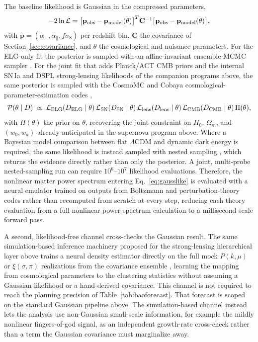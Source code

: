 \documentclass[10pt,onecolumn]{article}
\newcommand{\fsig}{f\sigma_8}
\begin{document}
The baseline likelihood is Gaussian in the compressed parameters,
\begin{equation}
  -2\ln\mathcal{L} =
  \big[\mathbf{p}_{\rm obs}-\mathbf{p}_{\rm model}(\theta)\big]^{T}
  \mathbf{C}^{-1}
  \big[\mathbf{p}_{\rm obs}-\mathbf{p}_{\rm model}(\theta)\big],
  \label{eq:gausslike}
\end{equation}
with $\mathbf{p}=(\alpha_\perp,\alpha_\parallel,\fsig)$ per redshift bin, $\mathbf{C}$ the covariance of Section~\ref{sec:covariance}, and $\theta$ the cosmological and nuisance parameters. For the ELG-only fit the posterior is sampled with an affine-invariant ensemble MCMC sampler \cite{emcee2013}. For the joint fit that adds Planck/ACT CMB priors and the internal SN\,Ia and DSPL strong-lensing likelihoods of the companion programs above, the same posterior is sampled with the CosmoMC and Cobaya cosmological-parameter-estimation codes \cite{lewisbridle2002,torradolewis2021},
\begin{equation}
  \mathcal{P}(\theta\mid D) \;\propto\;
  \mathcal{L}_{\rm ELG}(D_{\rm ELG}\mid\theta)\,
  \mathcal{L}_{\rm SN}(D_{\rm SN}\mid\theta)\,
  \mathcal{L}_{\rm lens}(D_{\rm lens}\mid\theta)\,
  \mathcal{L}_{\rm CMB}(D_{\rm CMB}\mid\theta)\,
  \Pi(\theta),
  \label{eq:jointpost}
\end{equation}
with $\Pi(\theta)$ the prior on $\theta$, recovering the joint constraint on $H_0$, $\Omega_m$, and $(w_0,w_a)$ already anticipated in the supernova program above. Where a Bayesian model comparison between flat $\Lambda$CDM and dynamic dark energy is required, the same likelihood is instead sampled with nested sampling \cite{polychord2015}, which returns the evidence directly rather than only the posterior. A joint, multi-probe nested-sampling run can require $10^6$--$10^7$ likelihood evaluations. Therefore, the nonlinear matter power spectrum entering Eq.~\eqref{eq:gausslike} is evaluated with a neural emulator trained on outputs from Boltzmann and perturbation-theory codes \cite{cosmopower2022,euclidemulator2021} rather than recomputed from scratch at every step, reducing each theory evaluation from a full nonlinear-power-spectrum calculation to a millisecond-scale forward pass.

A second, likelihood-free channel cross-checks the Gaussian result. The same simulation-based inference machinery proposed for the strong-lensing hierarchical layer above trains a neural density estimator directly on the full mock $P(k,\mu)$ or $\xi(\sigma,\pi)$ realizations from the covariance ensemble \cite{cranmer2020}, learning the mapping from cosmological parameters to the clustering statistics without assuming a Gaussian likelihood or a hand-derived covariance. This channel is not required to reach the planning precision of Table~\ref{tab:baoforecast}. That forecast is scoped on the standard Gaussian pipeline above. The simulation-based channel instead lets the analysis use non-Gaussian small-scale information, for example the mildly nonlinear fingers-of-god signal, as an independent growth-rate cross-check rather than a term the Gaussian covariance must marginalize away.
\end{document}
